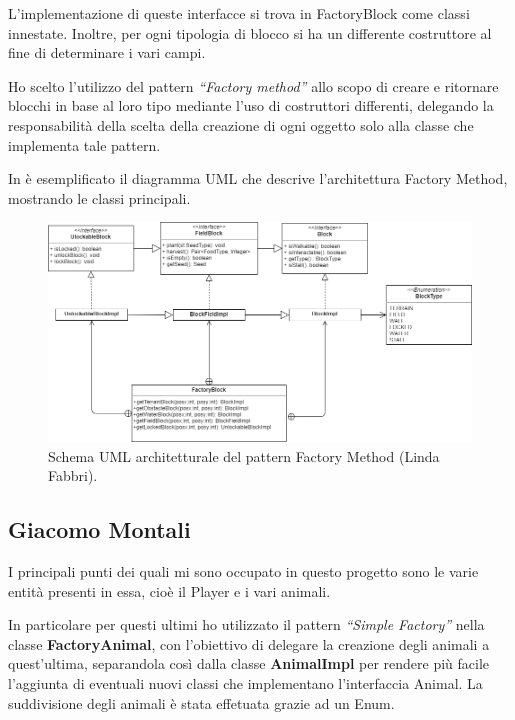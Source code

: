\documentclass[a4paper,12pt]{report}
\begin{document}
L’implementazione di queste interfacce si trova in FactoryBlock come classi innestate. Inoltre, per ogni tipologia di blocco si ha un differente costruttore al fine di determinare i vari campi. 

Ho scelto l’utilizzo del pattern \textit{“Factory method”} allo scopo di creare e ritornare blocchi in base al loro tipo mediante l’uso di costruttori differenti, delegando la responsabilità della scelta della creazione di ogni oggetto solo alla classe che implementa tale pattern.

In  è esemplificato il diagramma UML che descrive l'architettura Factory Method, mostrando le classi principali.

\hfill\break
\begin{figure}[!htb]
	\centering{}
	\includegraphics[width=\textwidth]{img/UML_FactoryLinda.png}
	\caption{Schema UML architetturale del pattern Factory Method (Linda Fabbri).}
	\label{img:LindaFabbri_Factory}
\end{figure}

\subsection{Giacomo Montali}

I principali punti dei quali mi sono occupato in questo progetto sono le varie entità presenti in essa, cioè il Player e i vari animali. 

In particolare per questi ultimi ho utilizzato il pattern \textit{“Simple Factory”}  nella classe \textbf{FactoryAnimal}, con l’obiettivo di delegare la creazione degli animali a quest’ultima, separandola così dalla classe \textbf{AnimalImpl} per  rendere più facile l'aggiunta di eventuali nuovi classi che implementano l'interfaccia Animal. La suddivisione degli animali è stata effetuata grazie ad un Enum.
\end{document}
